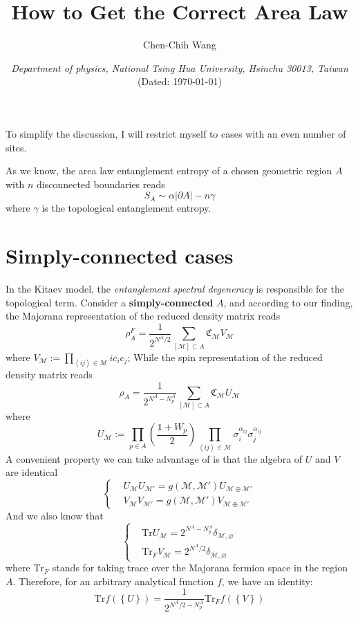 \documentclass[12font]{article}
\title{\textbf{ How to Get the Correct Area Law }}
\author{Chen-Chih Wang  }
\date{\textit{Department of physics, National Tsing Hua University, Hsinchu 30013, Taiwan} \\ (Dated: \today)}
\newcommand{\anglelr}[1]{\left\langle #1 \right\rangle}
\newcommand{\lr}[1]{\left(  #1  \right)}
\newcommand{\lrg}[1]{\left\{  #1  \right\}}
\newcommand{\abs}[1]{\left|  #1  \right|}
\newcommand{\de}{\partial}
\newcommand{\mrm}[1]{\mathrm{#1}}
\newcommand{\Tr}{\mrm{Tr}}
\newcommand{\dimer}[2]{\sigma^{\alpha_{#1 #2}}_{#1}\sigma^{\alpha_{#1 #2}}_{#2}}
\begin{document}
\maketitle

To simplify the discussion, I will restrict myself to cases with an even number of sites.

As we know, the area law entanglement entropy of a chosen geometric region $A$ with $n$ disconnected boundaries reads
\[
S_A \sim \alpha \abs{\de A} - n\gamma
\]
where $\gamma$ is the topological entanglement entropy. 
\section{Simply-connected cases}
In the Kitaev model, the \textit{entanglement spectral degeneracy} is responsible for the topological term. Consider a \textbf{simply-connected} $A$, and according to our finding, the Majorana representation of the reduced density matrix reads
\begin{equation}\label{equ.rho_F}
    \rho_A^F = \frac{1}{2^{N^A/2}}\sum_{[\mathcal{M}]\subset A}\mathfrak{C}_\mathcal{M}V_{\mathcal{M}}
\end{equation}
where $V_\mathcal{M} := \prod_{\anglelr{ij}\in\mathcal{M}}ic_ic_j$; While the spin representation of the reduced density matrix reads
\begin{equation}\label{equ.rho}
    \rho_A = \frac{1}{2^{N^A-N^A_p}}\sum_{[\mathcal{M}]\subset A}\mathfrak{C}_\mathcal{M}U_{\mathcal{M}}
\end{equation}
where
\[
U_\mathcal{M} := \prod_{p\in A}\lr{\frac{\mathds{1} + W_p}{2}}\prod_{\anglelr{ij}\in \mathcal{M}}\dimer{i}{j}
\]
A convenient property we can take advantage of is that the algebra of $U$ and $V$ are identical
\[
\left\{
\begin{aligned}
& U_\mathcal{M}U_{\mathcal{M'}}=g(\mathcal{M},\mathcal{M}')U_{\mathcal{M}\oplus\mathcal{M}'} \\
& V_\mathcal{M}V_{\mathcal{M'}}=g(\mathcal{M},\mathcal{M}')V_{\mathcal{M}\oplus\mathcal{M}'}
\end{aligned}
\right.
\]
And we also know that 
\[
\left\{
\begin{aligned}
&\Tr U_{\mathcal{M}} = 2^{N^A-N^A_p}\delta_{\mathcal{M},\varnothing} \\
& \Tr_F V_{\mathcal{M}} = 2^{N^A/2}\delta_{\mathcal{M},\varnothing}
\end{aligned}
\right.
\]
where $\Tr_F$ stands for taking trace over the Majorana fermion space in the region $A$. Therefore, for an arbitrary analytical function $f$, we have an identity:
\begin{equation}\label{equ.identity}
    \Tr f(\lrg{U}) = \frac{1}{2^{N^A/2 - N^A_p}}\Tr_F f(\lrg{V})
\end{equation}
\end{document}
